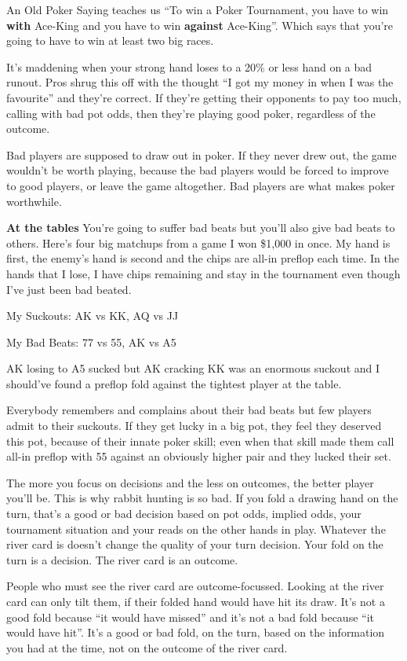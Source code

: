 An Old Poker Saying teaches us ``To win a
Poker Tournament, you have to win \textbf{with} Ace-King and
you have to win \textbf{against} Ace-King''. Which says that you're
going to have to win at least two big races.

It's maddening when your strong hand loses to a 20\% or less
hand on a bad runout. Pros shrug this off with
the thought ``I got my money in when I was the favourite'' and they're
correct. If they're getting their opponents to pay too much, calling
with bad pot odds, then they're playing good poker, regardless of
the outcome.

Bad players are supposed to draw out in poker. If they never drew
out, the game wouldn't be worth playing, because the bad players
would be forced to improve to good players, or leave the game
altogether. Bad players are what makes poker worthwhile.

\textbf{At the tables} You're going to suffer bad beats but you'll
also give bad beats to others. Here's four big matchups from a game
I won \$1,000 in once. My hand is first, the enemy's hand is second
and the chips are all-in preflop each time. In the hands that I
lose, I have chips remaining and stay in the tournament even
though I've just been bad beated.

My Suckouts: AK vs KK, AQ vs JJ

My Bad Beats: 77 vs 55, AK vs A5

AK losing to A5 sucked but AK cracking KK was an enormous suckout and
I should've found a preflop fold against the tightest player at the
table.

Everybody remembers and complains about their bad beats but few
players admit to their suckouts. If they get lucky in a big pot, they
feel they deserved this pot, because of their innate poker skill;
even when that skill made them call all-in preflop with 55 against an
obviously higher pair and they lucked their set.


The more you focus on decisions and the less on outcomes, the
better player you'll be. This is why rabbit hunting is so bad. If you
fold a drawing hand on the turn, that's a good or bad decision based
on pot odds, implied odds, your tournament
situation and your reads on the other hands in play. Whatever the
river card is doesn't change the quality of your turn decision. Your
fold on the turn is a decision. The river card is an outcome.

People who must see the river card are outcome-focussed. Looking
at the river card can only tilt them, if their folded hand would
have hit its draw. It's not a good fold because ``it would have
missed'' and it's not a bad fold because ``it would have hit''. It's
a good or bad fold, on the turn, based on the information you
had at the time, not on the outcome of the river card.

